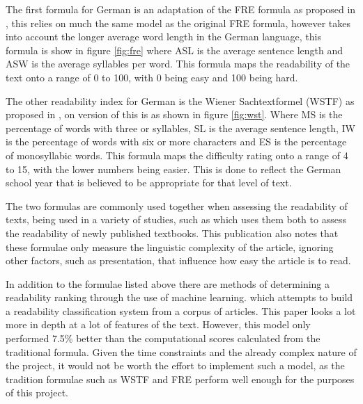 The first formula for German is an adaptation of the FRE formula as proposed in \textcite{amstad1978}, this relies on much the same model as the original FRE formula, however takes into account the longer average word length in the German language, this formula is show in figure \ref{fig:fre} where  ASL is the average sentence length and ASW is the average syllables per word. This formula maps the readability of the text onto a range of 0 to 100, with 0 being easy and 100 being hard. 



The other readability index for German is the  Wiener Sachtextformel (WSTF) as proposed in \textcite{bamberger1984}, on version of this is as shown in figure \ref{fig:wst}. Where MS is the percentage of words with three or syllables, SL is the average sentence length, IW is the percentage of words with six or more characters and ES is the percentage of monosyllabic words. This formula maps the difficulty rating onto a range of 4 to 15, with the lower numbers being easier. This is done to reflect the German school year that is believed to be appropriate for that level of text.



The two formulas are commonly used together when assessing the readability of texts, being used in a variety of studies, such as \textcite{rottensteiner2010} which uses them both to assess the readability of newly published textbooks. This publication also notes that these formulae only measure the linguistic complexity of the article, ignoring other factors, such as presentation, that influence how easy the article is to read. 

In addition to the formulae listed above there are methods of determining a readability ranking through the use of machine learning. \textcite{hancke2012} which attempts to build a readability classification system from a corpus of articles. This paper looks a lot more in depth at a lot of features of the text. However, this model only performed 7.5\% better than the computational scores calculated from the traditional formula. Given the time constraints and the already complex nature of the project, it would not be worth the effort to implement such a model, as the tradition formulae such as WSTF and FRE perform well enough for the purposes of this project. 